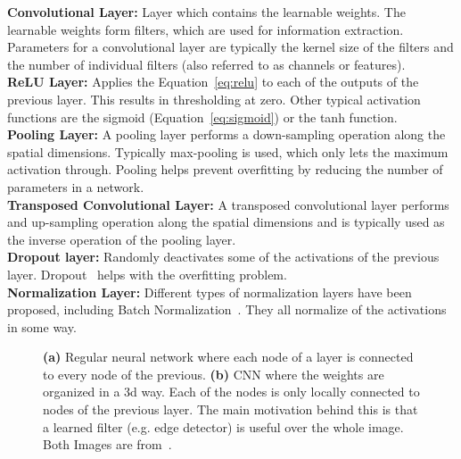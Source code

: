 \textbf{Convolutional Layer:} Layer which contains the learnable weights. The learnable weights form filters, which are used for information extraction. Parameters for a convolutional layer are typically the kernel size of the filters and the number of individual filters (also referred to as channels or features).\\

\textbf{ReLU Layer:} Applies the Equation~\ref{eq:relu} to each of the outputs of the previous layer. This results in thresholding at zero. Other typical activation functions are the sigmoid (Equation~\ref{eq:sigmoid}) or the tanh function.\\

\textbf{Pooling Layer:} A pooling layer performs a down-sampling operation along the spatial dimensions. Typically max-pooling is used, which only lets the maximum activation through. Pooling helps prevent overfitting by reducing the number of parameters in a network.\\

\textbf{Transposed Convolutional Layer:} A transposed convolutional layer performs and up-sampling operation along the spatial dimensions and is typically used as the inverse operation of the pooling layer.\\

\textbf{Dropout layer:} Randomly deactivates some of the activations of the previous layer. Dropout~\cite{Srivastava2014Dropout:Overfitting} helps with the overfitting problem.\\

\textbf{Normalization Layer:} Different types of normalization layers have been proposed, including Batch Normalization~\cite{SergeyIoffe2015BatchNormalization}. They all normalize of the activations in some way.
 
\begin{figure}[htbp]
	\centering
	\hfill
	\caption[Sections of MRN sequences]{\textbf{(a)} Regular neural network where each node of a layer is connected to every node of the previous. \textbf{(b)} CNN where the weights are organized in a \gls{3d} way. Each of the nodes is only locally connected to nodes of the previous layer. The main motivation behind this is that a learned filter (e.g. edge detector) is useful over the whole image. Both Images are from~\cite{KarpathyStanfordRecognition}.}
	\label{fig:mlearn_nn_cnn}  
\end{figure}


